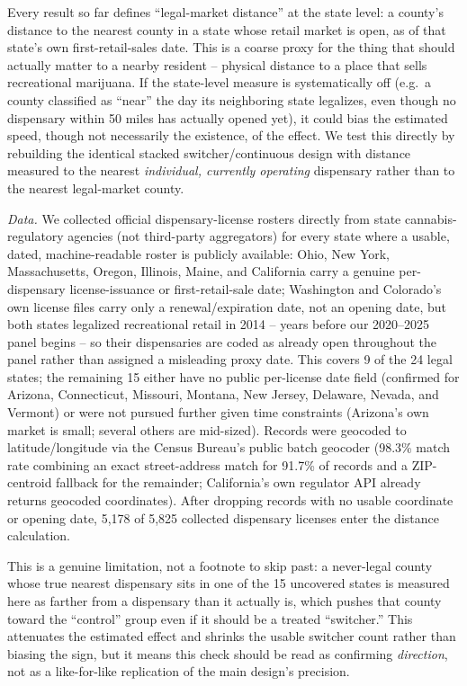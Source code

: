 \documentclass[preprint,12pt,authoryear]{elsarticle}
\begin{document}
Every result so far defines ``legal-market distance'' at the state
level: a county's distance to the nearest county in a state whose
retail market is open, as of that state's own first-retail-sales date.
This is a coarse proxy for the thing that should actually matter to a
nearby resident -- physical distance to a place that sells recreational
marijuana. If the state-level measure is systematically off (e.g.\ a
county classified as ``near'' the day its neighboring state legalizes,
even though no dispensary within 50 miles has actually opened yet), it
could bias the estimated speed, though not necessarily the existence,
of the effect. We test this directly by rebuilding the identical
stacked switcher/continuous design with distance measured to the
nearest \emph{individual, currently operating} dispensary rather than
to the nearest legal-market county.

\emph{Data.} We collected official dispensary-license rosters directly
from state cannabis-regulatory agencies (not third-party aggregators)
for every state where a usable, dated, machine-readable roster is
publicly available: Ohio, New York, Massachusetts, Oregon, Illinois,
Maine, and California carry a genuine per-dispensary license-issuance
or first-retail-sale date; Washington and Colorado's own license files
carry only a renewal/expiration date, not an opening date, but both
states legalized recreational retail in 2014 -- years before our
2020--2025 panel begins -- so their dispensaries are coded as already
open throughout the panel rather than assigned a misleading proxy
date. This covers 9 of the 24 legal states; the remaining 15 either
have no public per-license date field (confirmed for Arizona,
Connecticut, Missouri, Montana, New Jersey, Delaware, Nevada, and
Vermont) or were not pursued further given time constraints (Arizona's
own market is small; several others are mid-sized). Records were
geocoded to latitude/longitude via the Census Bureau's public batch
geocoder (98.3\% match rate combining an exact street-address match for
91.7\% of records and a ZIP-centroid fallback for the remainder;
California's own regulator API already returns geocoded coordinates).
After dropping records with no usable coordinate or opening date, 5,178
of 5,825 collected dispensary licenses enter the distance calculation.

This is a genuine limitation, not a footnote to skip past: a
never-legal county whose true nearest dispensary sits in one of the 15
uncovered states is measured here as farther from a dispensary than it
actually is, which pushes that county toward the ``control'' group even
if it should be a treated ``switcher.'' This attenuates the estimated
effect and shrinks the usable switcher count rather than biasing the
sign, but it means this check should be read as confirming
\emph{direction}, not as a like-for-like replication of the main
design's precision.
\end{document}
